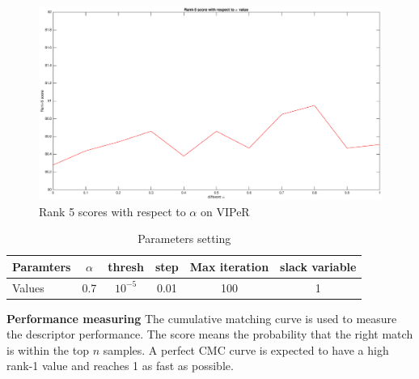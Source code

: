 \documentclass[conference,compsoc]{IEEEtran}
\begin{document}
\begin{figure}
\begin{raggedleft}
\includegraphics[width=1\linewidth]{Rank5scoresAlpha.eps}
\vspace{-3em}
\caption{Rank 5 scores with respect to $\alpha$ on VIPeR}
\end{raggedleft}
\end{figure}


\begin{table}[H]
\caption{Parameters setting}
\begin{tabular}{|l|c|c|c|c|c|}
\hline
Paramters &$\alpha$&thresh&step&Max iteration& slack variable\\
\hline
Values &0.7&$10^{-5}$&0.01&100&1\\
\hline
\end{tabular}
\end{table}


\textbf{Performance measuring} The cumulative matching curve is used to measure the descriptor performance. The score means the probability that the right match is within the top $n$ samples. A perfect CMC curve is expected to have a high rank-1 value and reaches 1 as fast as possible.
\end{document}
